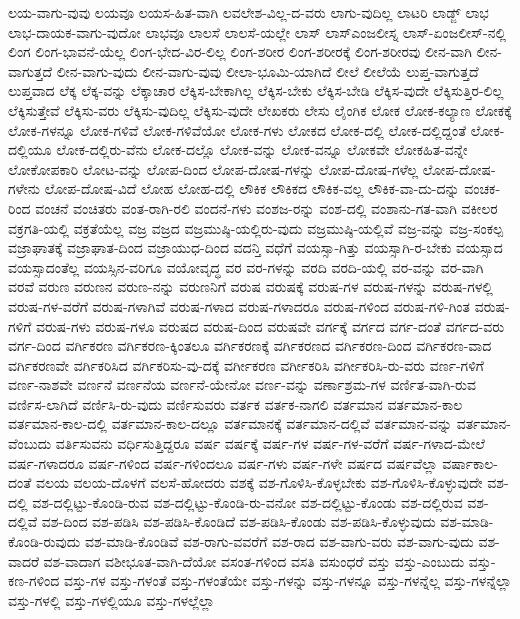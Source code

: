 {ಲಯ-ವಾಗು-ವುವು
ಲಯವೂ
ಲಯಸ-ಹಿತ-ವಾಗಿ
ಲವಲೇಶ-ವಿಲ್ಲ-ದ-ವರು
ಲಾಗು-ವುದಿಲ್ಲ
ಲಾಟರಿ
ಲಾಡ್ಜ್
ಲಾಭ
ಲಾಭ-ದಾಯಕ-ವಾಗು-ವುದೋ
ಲಾಭವೂ
ಲಾಲಸೆ
ಲಾಲಸೆ-ಯಲ್ಲೇ
ಲಾಸ್
ಲಾಸ್ಎಂಜಲೀಸ್ನ
ಲಾಸ್-ಏಂಜಲೀಸ್-ನಲ್ಲಿ
ಲಿಂಗ
ಲಿಂಗ-ಭಾವನೆ-ಯೆಲ್ಲ
ಲಿಂಗ-ಭೇದ-ವಿರ-ಲಿಲ್ಲ
ಲಿಂಗ-ಶರೀರ
ಲಿಂಗ-ಶರೀರಕ್ಕೆ
ಲಿಂಗ-ಶರೀರವು
ಲೀನ-ವಾಗಿ
ಲೀನ-ವಾಗುತ್ತದೆ
ಲೀನ-ವಾಗು-ವುದು
ಲೀನ-ವಾಗು-ವುವು
ಲೀಲಾ-ಭೂಮಿ-ಯಾಗಿದೆ
ಲೀಲೆ
ಲೀಲೆಯೆ
ಲುಪ್ತ-ವಾಗುತ್ತದೆ
ಲುಪ್ತವಾದ
ಲೆಕ್ಕ
ಲೆಕ್ಕ-ವನ್ನು
ಲೆಕ್ಕಾಚಾರ
ಲೆಕ್ಕಿಸ-ಬೇಕಾಗಿಲ್ಲ
ಲೆಕ್ಕಿಸ-ಬೇಕು
ಲೆಕ್ಕಿಸ-ಬೇಡಿ
ಲೆಕ್ಕಿಸ-ವುದೇ
ಲೆಕ್ಕಿಸುತ್ತಿರ-ಲಿಲ್ಲ
ಲೆಕ್ಕಿಸುತ್ತೇವೆ
ಲೆಕ್ಕಿಸು-ವರು
ಲೆಕ್ಕಿಸು-ವುದಿಲ್ಲ
ಲೆಕ್ಕಿಸು-ವುದೇ
ಲೇಖಕರು
ಲೇಸು
ಲೈಂಗಿಕ
ಲೋಕ
ಲೋಕ-ಕಲ್ಯಾಣ
ಲೋಕಕ್ಕೆ
ಲೋಕ-ಗಳನ್ನೂ
ಲೋಕ-ಗಳಿವೆ
ಲೋಕ-ಗಳಿವೆಯೋ
ಲೋಕ-ಗಳು
ಲೋಕದ
ಲೋಕ-ದಲ್ಲಿ
ಲೋಕ-ದಲ್ಲಿದ್ದಂತೆ
ಲೋಕ-ದಲ್ಲಿಯೂ
ಲೋಕ-ದಲ್ಲಿರು-ವೆನು
ಲೋಕ-ದಲ್ಲೊ
ಲೋಕ-ವನ್ನು
ಲೋಕ-ವನ್ನೂ
ಲೋಕವೇ
ಲೋಕಹಿತ-ವನ್ನೇ
ಲೋಕೋಪಕಾರಿ
ಲೋಟ-ವನ್ನು
ಲೋಪ-ದಿಂದ
ಲೋಪ-ದೋಷ-ಗಳನ್ನು
ಲೋಪ-ದೋಷ-ಗಳೆಲ್ಲ
ಲೋಪ-ದೋಷ-ಗಳೇನು
ಲೋಪ-ದೋಷ-ವಿದೆ
ಲೋಹ
ಲೋಹ-ದಲ್ಲಿ
ಲೌಕಿಕ
ಲೌಕಿಕದ
ಲೌಕಿಕ-ವಲ್ಲ
ಲೌಕಿಕ-ವಾ-ದು-ದನ್ನು
ವಂಚಕ-ರಿಂದ
ವಂಚನೆ
ವಂಚಿತರು
ವಂತ-ರಾಗಿ-ರಲಿ
ವಂದನೆ-ಗಳು
ವಂಶಜ-ರನ್ನು
ವಂಶ-ದಲ್ಲಿ
ವಂಶಾನು-ಗತ-ವಾಗಿ
ವಕೀಲರ
ವಕ್ರಗತಿ-ಯಲ್ಲಿ
ವಕ್ರತೆಯೆಲ್ಲ
ವಜ್ರ
ವಜ್ರದ
ವಜ್ರಮುಷ್ಠಿ-ಯಲ್ಲಿರು-ವುದು
ವಜ್ರಮುಷ್ಠಿ-ಯಲ್ಲಿವೆ
ವಜ್ರ-ವನ್ನು
ವಜ್ರ-ಸಂಕಲ್ಪ
ವಜ್ರಾಘಾತಕ್ಕೆ
ವಜ್ರಾಘಾತ-ದಿಂದ
ವಜ್ರಾಯುಧ-ದಿಂದ
ವದನ್ತಿ
ವಧೆಗೆ
ವಯಸ್ಸಾ-ಗಿತ್ತು
ವಯಸ್ಸಾಗಿ-ರ-ಬೇಕು
ವಯಸ್ಸಾದ
ವಯಸ್ಸಾದಂತೆಲ್ಲ
ವಯಸ್ಸಿನ-ವರಿಗೂ
ವಯೋವೃದ್ಧ
ವರ
ವರ-ಗಳನ್ನು
ವರದಿ
ವರದಿ-ಯಲ್ಲಿ
ವರ-ವನ್ನು
ವರ-ವಾಗಿ
ವರವೆ
ವರುಣ
ವರುಣನ
ವರುಣ-ನನ್ನು
ವರುಣನಿಗೆ
ವರುಷ
ವರುಷಕ್ಕೆ
ವರುಷ-ಗಳ
ವರುಷ-ಗಳನ್ನು
ವರುಷ-ಗಳಲ್ಲಿ
ವರುಷ-ಗಳ-ವರೆಗೆ
ವರುಷ-ಗಳಾಗಿವೆ
ವರುಷ-ಗಳಾದ
ವರುಷ-ಗಳಾದರೂ
ವರುಷ-ಗಳಿಂದ
ವರುಷ-ಗಳಿ-ಗಿಂತ
ವರುಷ-ಗಳಿಗೆ
ವರುಷ-ಗಳು
ವರುಷ-ಗಳೂ
ವರುಷದ
ವರುಷ-ದಿಂದ
ವರುಷವೇ
ವರ್ಗಕ್ಕೆ
ವರ್ಗದ
ವರ್ಗ-ದಂತೆ
ವರ್ಗದ-ವರು
ವರ್ಗ-ದಿಂದ
ವರ್ಗಿಕರಣ
ವರ್ಗಿಕರಣ-ಕ್ಕಿಂತಲೂ
ವರ್ಗಿಕರಣಕ್ಕೆ
ವರ್ಗಿಕರಣದ
ವರ್ಗಿಕರಣ-ದಿಂದ
ವರ್ಗಿಕರಣ-ವಾದ
ವರ್ಗಿಕರಣವೇ
ವರ್ಗಿಕರಿಸಿದ
ವರ್ಗಿಕರಿಸು-ವು-ದಕ್ಕೆ
ವರ್ಗೀಕರಣ
ವರ್ಗೀಕರಿಸಿ
ವರ್ಗೀಕರಿಸಿ-ರು-ವರು
ವರ್ಣ-ಗಳಿಗೆ
ವರ್ಣ-ನಾಶವೇ
ವರ್ಣನೆ
ವರ್ಣನೆಯ
ವರ್ಣನೆ-ಯೇನೋ
ವರ್ಣ-ವನ್ನು
ವರ್ಣಾಶ್ರಮ-ಗಳ
ವರ್ಣಿತ-ವಾಗಿ-ರುವ
ವರ್ಣಿಸ-ಲಾಗಿದೆ
ವರ್ಣಿಸಿ-ರು-ವುದು
ವರ್ಣಿಸುವರು
ವರ್ತಕ
ವರ್ತಕ-ನಾಗಲಿ
ವರ್ತಮಾನ
ವರ್ತಮಾನ-ಕಾಲ
ವರ್ತಮಾನ-ಕಾಲ-ದಲ್ಲಿ
ವರ್ತಮಾನ-ಕಾಲ-ದಲ್ಲೂ
ವರ್ತಮಾನಕ್ಕೆ
ವರ್ತಮಾನ-ದಲ್ಲಿವೆ
ವರ್ತಮಾನ-ವನ್ನು
ವರ್ತಮಾನ-ವೆಂಬುದು
ವರ್ತಿಸುವನು
ವರ್ಧಿಸುತ್ತಿದ್ದರೂ
ವರ್ಷ
ವರ್ಷಕ್ಕೆ
ವರ್ಷ-ಗಳ
ವರ್ಷ-ಗಳ-ವರೆಗೆ
ವರ್ಷ-ಗಳಾದ-ಮೇಲೆ
ವರ್ಷ-ಗಳಾದರೂ
ವರ್ಷ-ಗಳಿಂದ
ವರ್ಷ-ಗಳಿಂದಲೂ
ವರ್ಷ-ಗಳು
ವರ್ಷ-ಗಳೇ
ವರ್ಷದ
ವರ್ಷವೆಲ್ಲಾ
ವರ್ಷಾಕಾಲ-ದಂತೆ
ವಲಯ
ವಲಯ-ದೊಳಗೆ
ವಲಸೆ-ಹೋದರು
ವಶಕ್ಕೆ
ವಶ-ಗೊಳಿಸಿ-ಕೊಳ್ಳಬೇಕು
ವಶ-ಗೊಳಿಸಿ-ಕೊಳ್ಳುವುದೇ
ವಶ-ದಲ್ಲಿ
ವಶ-ದಲ್ಲಿಟ್ಟು-ಕೊಂಡಿ-ರುವ
ವಶ-ದಲ್ಲಿಟ್ಟು-ಕೊಂಡಿ-ರು-ವನೋ
ವಶ-ದಲ್ಲಿಟ್ಟು-ಕೊಂಡು
ವಶ-ದಲ್ಲಿರುವ
ವಶ-ದಲ್ಲಿವೆ
ವಶ-ದಿಂದ
ವಶ-ಪಡಿಸಿ
ವಶ-ಪಡಿಸಿ-ಕೊಂಡಿದೆ
ವಶ-ಪಡಿಸಿ-ಕೊಂಡು
ವಶ-ಪಡಿಸಿ-ಕೊಳ್ಳುವುದು
ವಶ-ಮಾಡಿ-ಕೊಂಡಿ-ರುವುದು
ವಶ-ಮಾಡಿ-ಕೊಂಡಿವೆ
ವಶ-ರಾಗು-ವವರೆಗೆ
ವಶ-ರಾದ
ವಶ-ವಾಗು-ವರು
ವಶ-ವಾಗು-ವುದು
ವಶ-ವಾದರೆ
ವಶ-ವಾದಾಗ
ವಶೀಭೂತ-ವಾಗಿ-ದೆಯೋ
ವಸಂತ-ಗಳಿಂದ
ವಸತಿ
ವಸುಂಧರೆ
ವಸ್ತು
ವಸ್ತು-ಎಂಬುದು
ವಸ್ತು-ಕಣ-ಗಳಿಂದ
ವಸ್ತು-ಗಳ
ವಸ್ತು-ಗಳಂತೆ
ವಸ್ತು-ಗಳಂತೆಯೇ
ವಸ್ತು-ಗಳನ್ನು
ವಸ್ತು-ಗಳನ್ನೂ
ವಸ್ತು-ಗಳನ್ನೆಲ್ಲ
ವಸ್ತು-ಗಳನ್ನೆಲ್ಲಾ
ವಸ್ತು-ಗಳಲ್ಲಿ
ವಸ್ತು-ಗಳಲ್ಲಿಯೂ
ವಸ್ತು-ಗಳಲ್ಲೆಲ್ಲಾ
}
